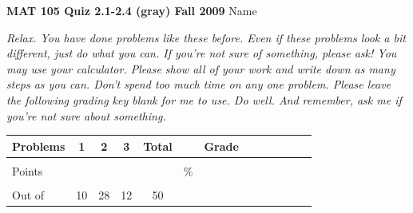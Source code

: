 \documentclass[12pt]{article}
\begin{document}
{\bf MAT 105 Quiz 2.1-2.4 (gray) Fall 2009} \hspace{.4in} {\large Name} \hrulefill

\hrulefill

 \emph{Relax.  You have done problems like these before.  Even if these problems look a bit different, just do what you can.  If you're not sure of something, please ask! You may use your calculator.  Please show all of your work and write down as many steps as you can.  Don't spend too much time on any one problem.  Please leave the following grading key blank for me to use.  Do well.  And remember, ask me if you're not sure about something.}

\begin{center}

\begin{tabular}
{|l|c|c|c|c|c|c|c|c|c|c|c|c|} \hline

 Problems & \hspace{5 pt} 1 \hspace{5 pt}  & \hspace{5 pt} 2 \hspace{5 pt} & \hspace{5 pt} 3 \hspace{5 pt} &  \hspace{5 pt} Total  \hspace{5 pt} & &  \hspace{5 pt} Grade \hspace{5 pt}  \\ \hline
&&&&&&\\  
Points &&&&&    \hspace{.8in}\% &  \\ 
&&&&&& \\  \hline
Out of & 10 & 28 & 12 &50 & & \\ \hline

\end {tabular}

\end{center}

\hrulefill
\end{document}
